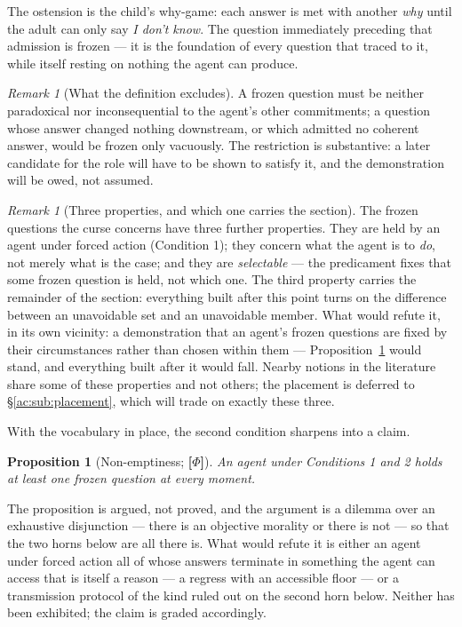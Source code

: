 \documentclass[11pt]{article}
\numberwithin{equation}{section}
\theoremstyle{plain}
\newtheorem{proposition}[theorem]{Proposition}
\theoremstyle{definition}
\theoremstyle{remark}
\newtheorem{remark}[theorem]{Remark}
\begin{document}
The ostension is the child's why-game: each answer is met with another \emph{why} until the adult can only say \emph{I don't know}. The question immediately preceding that admission is frozen --- it is the foundation of every question that traced to it, while itself resting on nothing the agent can produce.

\begin{remark}[What the definition excludes]\label{ac:rem:admissible}
A frozen question must be neither paradoxical nor inconsequential to the agent's other commitments; a question whose answer changed nothing downstream, or which admitted no coherent answer, would be frozen only vacuously. The restriction is substantive: a later candidate for the role will have to be shown to satisfy it, and the demonstration will be owed, not assumed.
\end{remark}

\begin{remark}[Three properties, and which one carries the section]\label{ac:rem:threeprops}
The frozen questions the curse concerns have three further properties. They are held by an agent under forced action (Condition 1); they concern what the agent is to \emph{do}, not merely what is the case; and they are \emph{selectable} --- the predicament fixes that some frozen question is held, not which one. The third property carries the remainder of the section: everything built after this point turns on the difference between an unavoidable set and an unavoidable member. What would refute it, in its own vicinity: a demonstration that an agent's frozen questions are fixed by their circumstances rather than chosen within them --- Proposition~\ref{ac:prop:nonempty} would stand, and everything built after it would fall. Nearby notions in the literature share some of these properties and not others; the placement is deferred to \S\ref{ac:sub:placement}, which will trade on exactly these three.
\end{remark}

With the vocabulary in place, the second condition sharpens into a claim.

\begin{proposition}[Non-emptiness; \textbf{[$\Phi$]}]\label{ac:prop:nonempty}
An agent under Conditions 1 and 2 holds at least one frozen question at every moment.
\end{proposition}

The proposition is argued, not proved, and the argument is a dilemma over an exhaustive disjunction --- there is an objective morality or there is not --- so that the two horns below are all there is. What would refute it is either an agent under forced action all of whose answers terminate in something the agent can access that is itself a reason --- a regress with an accessible floor --- or a transmission protocol of the kind ruled out on the second horn below. Neither has been exhibited; the claim is graded accordingly.
\end{document}
